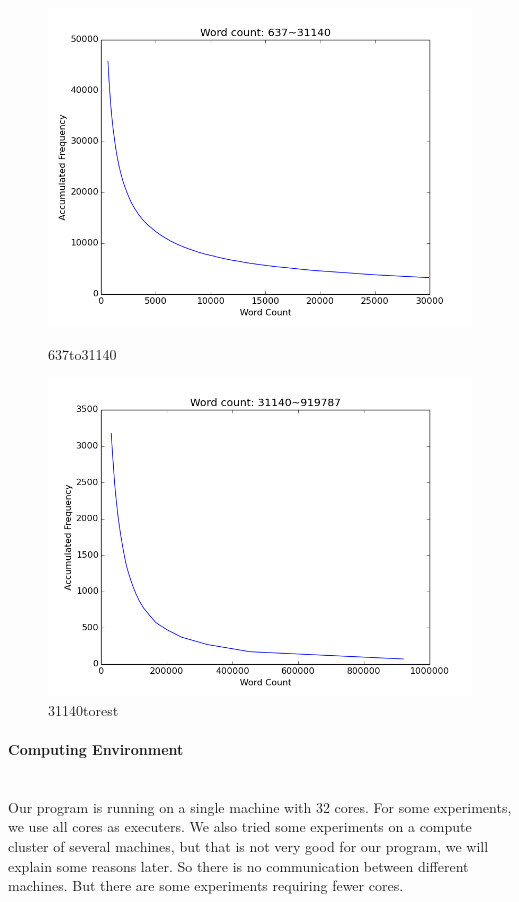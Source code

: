 \begin{figure}[H]
\centering
\begin{minipage}{.5\textwidth}
 	\includegraphics[width=1.0\textwidth]{637to31140} 
	\caption{637to31140}
	\label{fig:637to31140}
\end{minipage}%
\begin{minipage}{.5\textwidth}
	\includegraphics[width=1.0\textwidth]{31140torest} 
	\caption{31140torest}
	\label{fig:31140torest}
\end{minipage}
\end{figure}

\paragraph{Computing Environment} \ \\
Our program is running on a single machine with 32 cores. For some experiments, we use all cores as executers. We also tried some experiments on a compute cluster of several machines, but that is not very good for our program, we will explain some reasons later. So there is no communication between different machines.  But there are some experiments requiring fewer cores.


